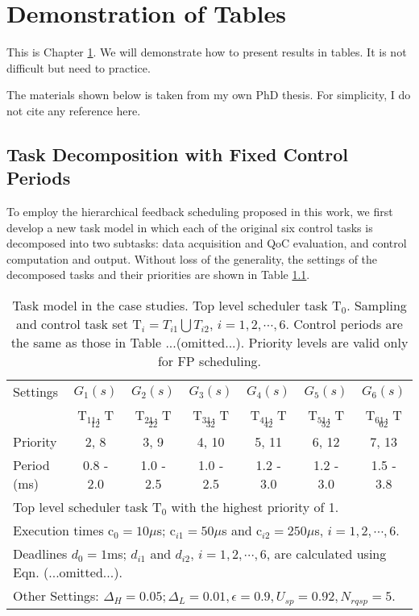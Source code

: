 
\chapter[Demonstration of Tables]{Demonstration of Tables}
\label{cha:cha4}

This is Chapter \ref{cha:cha4}. We will demonstrate how to present results in tables. It is not difficult but need to practice. 

The materials shown below is taken from my own PhD thesis. For simplicity, I do not cite any reference here. 


\section[Task Decomposition with Fixed Periods]{Task Decomposition with Fixed Control Periods}

To employ the hierarchical feedback scheduling proposed in this work, we first develop a new task model in which each of the original six control tasks is decomposed into two subtasks: data acquisition and QoC evaluation, and control computation and output. Without loss of the generality, the settings of the decomposed tasks and their priorities are shown in Table \ref{tab:taskmodel}. 

\begin{table}[htb!]
\setlength{\abovecaptionskip}{0.10\baselineskip plus 0.01\baselineskip minus 0.01\baselineskip}
\begin{center}
\caption[Task model in the case studies]{Task model in the case studies. Top level scheduler task T$_0$. Sampling and control task set T$_i = T_{i1}\bigcup T_{i2}$, $i = 1, 2, \cdots, 6$. Control periods are the same as those in Table ...(omitted...). Priority levels are valid only for FP scheduling.}
\label{tab:taskmodel}
\begin{tabular}{lcccccc}
\hline
Settings & {$G_1(s)$} & {$G_2(s)$} & {$G_3(s)$} & {$G_4(s)$} & {$G_5(s)$} & {$G_6(s)$}\\
 & T$_{11}$, T$_{12}$ & T$_{21}$, T$_{22}$ & T$_{31}$, T$_{32}$ & T$_{41}$, T$_{42}$ & T$_{51}$, T$_{52}$ & T$_{61}$, T$_{62}$\\
 \hline
 Priority & 2, 8 & 3, 9 & 4, 10 & 5, 11 & 6, 12 & 7, 13\\
 Period (ms) & {0.8 - 2.0} & {1.0 - 2.5} & {1.0 - 2.5} & {1.2 - 3.0} & {1.2 - 3.0} & {1.5 - 3.8}\\
 \hline
\multicolumn{7}{l}{Top level scheduler task T$_0$ with the highest priority of 1.}\\
\multicolumn{7}{l}{Execution times c$_{0} = 10\mu$s; c$_{i1} = 50\mu$s and c$_{i2}=250\mu$s, $i = 1, 2, \cdots, 6$.}\\
\multicolumn{7}{l}{Deadlines $d_{0} = 1$ms; $d_{i1}$ and $d_{i2}$, $i = 1, 2, \cdots, 6$, are calculated using Eqn. (...omitted...).}\\
\multicolumn{7}{l}{Other Settings: $\Delta_H = 0.05; \Delta_L = 0.01, \epsilon = 0.9, U_{sp} = 0.92, N_{rqsp}=5$.}\\
\hline
\end{tabular}
\end{center}
\end{table}

